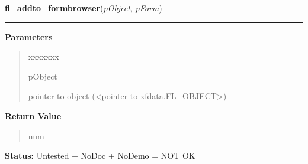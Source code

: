     \label{xformslib:library:fl_addto_formbrowser}

    \vspace{0.5ex}

\hspace{.8\funcindent}\begin{boxedminipage}{\funcwidth}

    \raggedright \textbf{fl\_addto\_formbrowser}(\textit{pObject}, \textit{pForm})

    \vspace{-1.5ex}

    \rule{\textwidth}{0.5\fboxrule}
\setlength{\parskip}{2ex}
\setlength{\parskip}{1ex}
      \textbf{Parameters}
      \vspace{-1ex}

      \begin{quote}
        \begin{Ventry}{xxxxxxx}

          \item[pObject]

          pointer to object ({\textless}pointer to 
          xfdata.FL\_OBJECT{\textgreater})

        \end{Ventry}

      \end{quote}

      \textbf{Return Value}
    \vspace{-1ex}

      \begin{quote}
      num

      \end{quote}

\textbf{Status:} Untested + NoDoc + NoDemo = NOT OK



    \end{boxedminipage}

    \label{xformslib:library:fl_delete_formbrowser_bynumber}

    \vspace{0.5ex}

